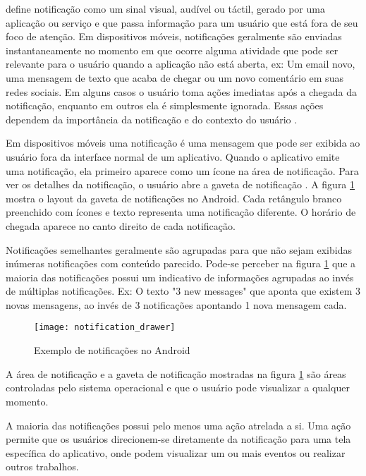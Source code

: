 \cite{iqbal2010notifications} define notificação como um sinal visual, audível ou táctil, gerado por uma aplicação
ou serviço e que passa informação para um usuário que está fora de seu foco de atenção. Em dispositivos móveis,
notificações geralmente são enviadas instantaneamente no momento em que ocorre alguma atividade que pode ser relevante
para o usuário quando a aplicação não está aberta, ex: Um email novo, uma mensagem de texto que acaba de chegar ou um
novo comentário em suas redes sociais. Em alguns casos o usuário toma ações imediatas após a chegada da notificação,
enquanto em outros ela é simplesmente ignorada. Essas ações dependem da importância da notificação e do contexto do
usuário \cite{sahami2014large}.

Em dispositivos móveis uma notificação é uma mensagem que pode ser exibida ao usuário fora da interface normal de um aplicativo.
Quando o aplicativo emite uma notificação, ela primeiro aparece como um ícone na área de notificação. Para ver os detalhes da
notificação, o usuário abre a gaveta de notificação \cite{notificationDrawer}. A figura \ref{notification-drawer} mostra
o layout da gaveta de notificações no Android. Cada retângulo branco preenchido com ícones e texto representa uma notificação
diferente. O horário de chegada aparece no canto direito de cada notificação.

Notificações semelhantes geralmente são agrupadas para que não sejam exibidas inúmeras notificações com conteúdo parecido.
Pode-se perceber na figura \ref{notification-drawer} que a maioria das notificações possui um indicativo de informações agrupadas
ao invés de múltiplas notificações. Ex: O texto "3 new messages" que aponta que existem 3 novas mensagens, ao invés de 3
notificações apontando 1 nova mensagem cada.

\begin{figure}[h]
\centering
\texttt{[image: notification\_drawer]}
\caption{Exemplo de notificações no Android \cite{notificationDrawer}}
\label{notification-drawer}
\end{figure}

A área de notificação e a gaveta de notificação mostradas na figura \ref{notification-drawer} são áreas controladas pelo
sistema operacional e que o usuário pode visualizar a qualquer momento.

A maioria das notificações possui pelo menos uma ação atrelada a si. Uma ação permite que os usuários direcionem-se
diretamente da notificação para uma tela específica do aplicativo, onde podem visualizar um ou mais eventos ou realizar outros trabalhos.
